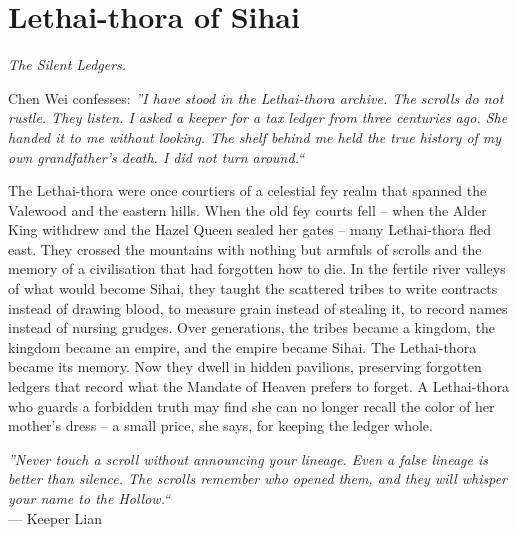 \documentclass[12pt,oneside]{book}
\begin{document}
\newpage

\newpage

\chapter{Lethai-thora of Sihai}
\emph{The Silent Ledgers.}

\noindent
Chen Wei confesses: \textit{''I have stood in the Lethai-thora archive. The scrolls do not rustle. They listen. I asked a keeper for a tax ledger from three centuries ago. She handed it to me without looking. The shelf behind me held the true history of my own grandfather's death. I did not turn around.``}

\noindent
The Lethai-thora were once courtiers of a celestial fey realm that spanned the Valewood and the eastern hills. When the old fey courts fell -- when the Alder King withdrew and the Hazel Queen sealed her gates -- many Lethai-thora fled east. They crossed the mountains with nothing but armfuls of scrolls and the memory of a civilisation that had forgotten how to die. In the fertile river valleys of what would become Sihai, they taught the scattered tribes to write contracts instead of drawing blood, to measure grain instead of stealing it, to record names instead of nursing grudges. Over generations, the tribes became a kingdom, the kingdom became an empire, and the empire became Sihai. The Lethai-thora became its memory. Now they dwell in hidden pavilions, preserving forgotten ledgers that record what the Mandate of Heaven prefers to forget. A Lethai-thora who guards a forbidden truth may find she can no longer recall the color of her mother's dress -- a small price, she says, for keeping the ledger whole.

\vspace{0.5em}
\noindent\textit{''Never touch a scroll without announcing your lineage. Even a false lineage is better than silence. The scrolls remember who opened them, and they will whisper your name to the Hollow.``} \\
--- Keeper Lian
\end{document}
